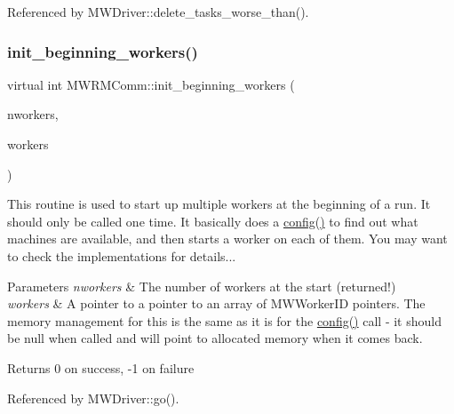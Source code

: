 Referenced by M\+W\+Driver\+::delete\+\_\+tasks\+\_\+worse\+\_\+than().

\mbox{\label{classMWRMComm_a50088a80976b2aee031e987393bceeb2}} 
\subsubsection{\texorpdfstring{init\+\_\+beginning\+\_\+workers()}{init\_beginning\_workers()}}
{\footnotesize\ttfamily virtual int M\+W\+R\+M\+Comm\+::init\+\_\+beginning\+\_\+workers (\begin{DoxyParamCaption}\item[{int $\ast$}]{nworkers,  }\item[{M\+W\+Worker\+ID $\ast$$\ast$$\ast$}]{workers }\end{DoxyParamCaption})\hspace{0.3cm}{\ttfamily [pure virtual]}}

This routine is used to start up multiple workers at the beginning of a run. It should only be called one time. It basically does a \hyperlink{classMWRMComm_a14c2e55899e741afad81df95f33afa5d}{config()} to find out what machines are available, and then starts a worker on each of them. You may want to check the implementations for details... 
\begin{DoxyParams}{Parameters}
{\em nworkers} & The number of workers at the start (returned!) \\
\hline
{\em workers} & A pointer to a pointer to an array of M\+W\+Worker\+ID pointers. The memory management for this is the same as it is for the \hyperlink{classMWRMComm_a14c2e55899e741afad81df95f33afa5d}{config()} call -\/ it should be null when called and will point to allocated memory when it comes back. \\
\hline
\end{DoxyParams}
\begin{DoxyReturn}{Returns}
0 on success, -\/1 on failure 
\end{DoxyReturn}


Referenced by M\+W\+Driver\+::go().

\mbox{\label{classMWRMComm_a12c2add8bea8577d5d150c49c7d42e5d}} 
